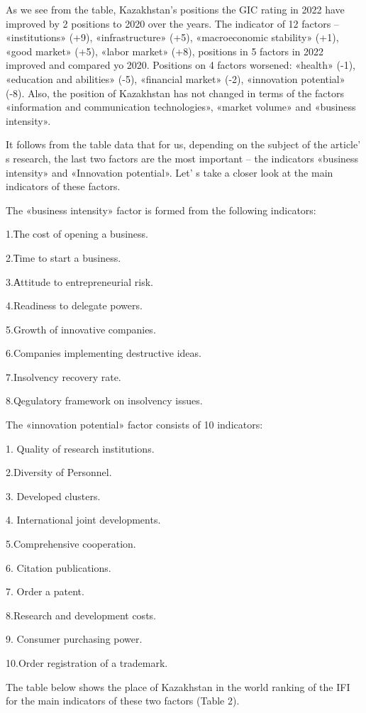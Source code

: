 \begin{multicols}{2}
As we see from the table, Kazakhstan's positions the GIC rating in 2022
have improved by 2 positions to 2020 over the years. The indicator of 12
factors -- «institutions» (+9), «infrastructure» (+5), «macroeconomic
stability» (+1), «good market» (+5), «labor market» (+8), positions in 5
factors in 2022 improved and compared yo 2020. Positions on 4 factors
worsened: «health» (-1), «education and abilities» (-5), «financial
market» (-2), «innovation potential» (-8). Also, the position of
Kazakhstan has not changed in terms of the factors «information and
communication technologies», «market volume» and «business intensity».

It follows from the table data that for us, depending on the subject of
the article' s research, the last two factors are the
most important -- the indicators «business intensity» and «Innovation
potential». Let' s take a closer look at the main
indicators of these factors.

The «business intensity» factor is formed from the following indicators:

1.Тhe cost of opening a business.

2.Тime to start a business.

3.Аttitude to entrepreneurial risk.

4.Readiness to delegate powers.

5.Growth of innovative companies.

6.Companies implementing destructive ideas.

7.Insolvency recovery rate.

8.Qegulatory framework on insolvency issues.

The «innovation potential» factor consists of 10 indicators:

1. Quality of research institutions.

2.Diversity of Personnel.

3. Developed clusters.

4. International joint developments.

5.Comprehensive cooperation.

6. Citation publications.

7. Order a patent.

8.Research and development costs.

9. Consumer purchasing power.

10.Order registration of a trademark.

The table below shows the place of Kazakhstan in the world ranking of
the IFI for the main indicators of these two factors (Table 2).
\end{multicols}

